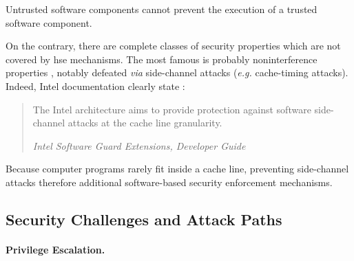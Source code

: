 \begin{definition}[Availability]
  Untrusted software components cannot prevent the execution of a trusted
  software component.
\end{definition}

On the contrary, there are complete classes of security properties which are not
covered by \ac{hse} mechanisms.
%
%
The most famous is probably noninterference properties , notably
defeated \emph{via} side-channel attacks (\emph{e.g.} cache-timing
attacks). Indeed, Intel documentation clearly state
%
:

\begin{quote}
  The Intel architecture aims to provide protection against software
  side-channel attacks at the cache line granularity.

  \hfill\small \emph{Intel Software Guard Extensions, Developer Guide}
\end{quote}

Because computer programs rarely fit inside a cache line, preventing
side-channel attacks therefore additional software-based security enforcement
mechanisms.
%

\subsection{Security Challenges and Attack Paths}

\paragraph{Privilege Escalation.}
%

